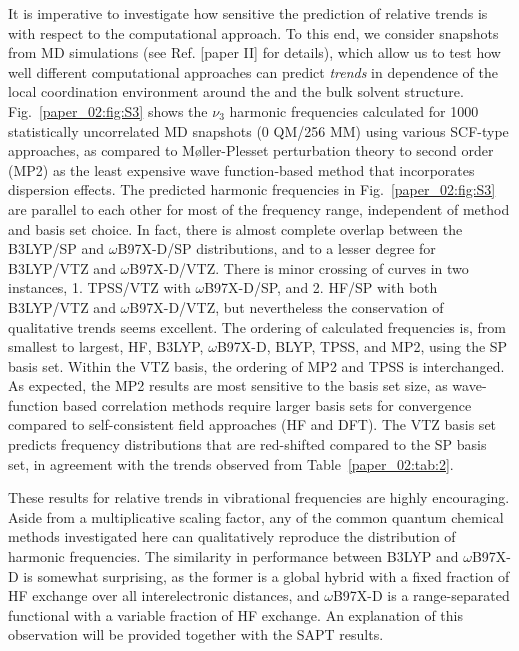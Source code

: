 It is imperative to investigate how sensitive the prediction of relative trends is with respect to the computational approach. To this end, we consider snapshots from MD simulations (see Ref. {[}paper II{]} for details), which allow us to test how well different computational approaches can predict \emph{trends} in dependence of the local coordination environment around the  and the bulk solvent structure. Fig.~\ref{paper_02:fig:S3} shows the  \(\nu_{3}\) harmonic frequencies calculated for \num{1000} statistically uncorrelated MD snapshots (0 QM/256 MM) using various SCF-type approaches, as compared to Møller-Plesset perturbation theory to second order (MP2) as the least expensive wave function-based method that incorporates dispersion effects.\cite{WCMS:WCMS58} The predicted harmonic frequencies in Fig.~\ref{paper_02:fig:S3} are parallel to each other for most of the frequency range, independent of method and basis set choice. In fact, there is almost complete overlap between the B3LYP/SP and \(\omega\)B97X-D/SP distributions, and to a lesser degree for B3LYP/VTZ and \(\omega\)B97X-D/VTZ. There is minor crossing of curves in two instances, 1. TPSS/VTZ with \(\omega\)B97X-D/SP, and 2. HF/SP with both B3LYP/VTZ and \(\omega\)B97X-D/VTZ, but nevertheless the conservation of qualitative trends seems excellent. The ordering of calculated frequencies is, from smallest to largest, HF, B3LYP, \(\omega\)B97X-D, BLYP, TPSS, and MP2, using the SP basis set. Within the VTZ basis, the ordering of MP2 and TPSS is interchanged. As expected, the MP2 results are most sensitive to the basis set size, as wave-function based correlation methods require larger basis sets for convergence compared to self-consistent field approaches (HF and DFT). The VTZ basis set predicts frequency distributions that are red-shifted compared to the SP basis set, in agreement with the trends observed from Table~\ref{paper_02:tab:2}.

These results for relative trends in vibrational frequencies are highly encouraging. Aside from a multiplicative scaling factor, any of the common quantum chemical methods investigated here can qualitatively reproduce the distribution of harmonic frequencies. The similarity in performance between B3LYP and \(\omega\)B97X-D is somewhat surprising, as the former is a global hybrid with a fixed fraction of HF exchange over all interelectronic distances, and \(\omega\)B97X-D is a range-separated functional with a variable fraction of HF exchange. An explanation of this observation will be provided together with the SAPT results.

